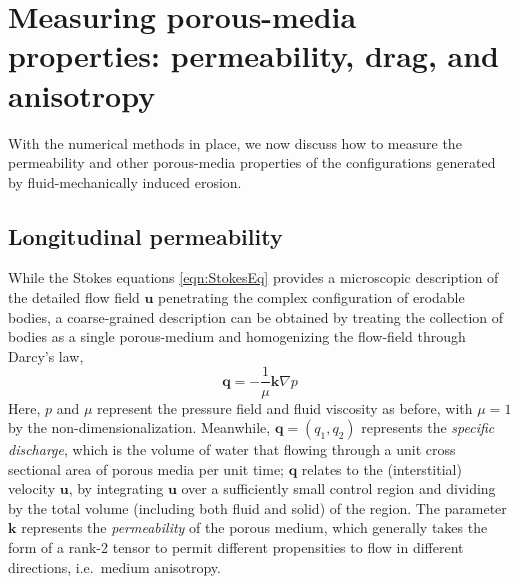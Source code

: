 \documentclass[3p]{elsarticle}
\newcommand{\grad}{{\nabla}}
\newcommand{\uu}{{\mathbf{u}}}
\newcommand{\bvec}[1]{\mathbf{#1}}
\newcommand {\bq} {\bvec{q}}
\begin{document}
\section{Measuring porous-media properties: permeability, drag, and anisotropy}
\label{sec:}

With the numerical methods in place, we now discuss how to measure the permeability and other porous-media properties of the configurations generated by fluid-mechanically induced erosion.

\subsection{Longitudinal permeability}
\label{LongPerm}

While the Stokes equations \eqref{eqn:StokesEq} provides a microscopic description of the detailed flow field $\uu$ penetrating the complex configuration of erodable bodies, a coarse-grained description can be obtained by treating the collection of bodies as a single porous-medium and homogenizing the flow-field through Darcy's law,
\begin{equation}
\label{eqn:Darcy}
\bq = - \frac{1}{\mu} \bvec{k} \grad p
\end{equation}
Here, $p$ and $\mu$ represent the pressure field and fluid viscosity as before, with $\mu = 1$ by the non-dimensionalization. Meanwhile, $\bq = (q_1, q_2)$ represents the {\em specific discharge}, which is the volume of water that flowing through a unit cross sectional area of porous media per unit time; $\bq$ relates to the (interstitial) velocity $\uu$, by integrating $\uu$ over a sufficiently small control region and dividing by the total volume (including both fluid and solid) of the region. The parameter $\bvec{k}$ represents the {\em permeability} of the porous medium, which generally takes the form of a rank-2 tensor to permit different propensities to flow in different directions, i.e.~medium anisotropy. 


\end{document}
